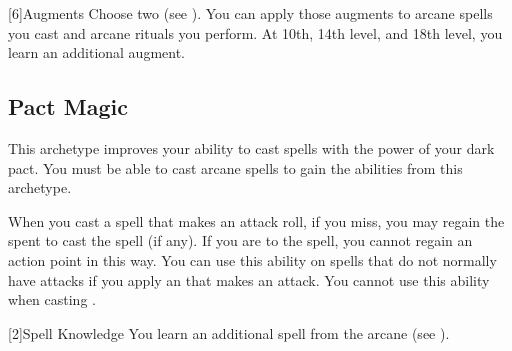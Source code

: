         [6]{Augments}
        Choose two  (see ).
        You can apply those augments to arcane spells you cast and arcane rituals you perform.
        At 10th, 14th level, and 18th level, you learn an additional augment.

    \subsection{Pact Magic}
        This archetype improves your ability to cast spells with the power of your dark pact.
        You must be able to cast arcane spells to gain the abilities from this archetype.

        When you cast a spell that makes an attack roll, if you miss, you may regain the  spent to cast the spell (if any).
        If you are  to the spell, you cannot regain an action point in this way.
        You can use this ability on spells that do not normally have attacks if you apply an  that makes an attack.
        You cannot use this ability when casting .

        [2]{Spell Knowledge}
        You learn an additional spell from the arcane  (see ).

